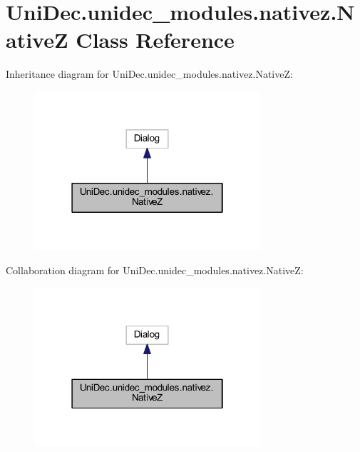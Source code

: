 \hypertarget{class_uni_dec_1_1unidec__modules_1_1nativez_1_1_native_z}{}\section{Uni\+Dec.\+unidec\+\_\+modules.\+nativez.\+Native\+Z Class Reference}
\label{class_uni_dec_1_1unidec__modules_1_1nativez_1_1_native_z}


Inheritance diagram for Uni\+Dec.\+unidec\+\_\+modules.\+nativez.\+Native\+Z\+:\nopagebreak
\begin{figure}[H]
\begin{center}
\leavevmode
\includegraphics[width=238pt]{class_uni_dec_1_1unidec__modules_1_1nativez_1_1_native_z__inherit__graph}
\end{center}
\end{figure}


Collaboration diagram for Uni\+Dec.\+unidec\+\_\+modules.\+nativez.\+Native\+Z\+:\nopagebreak
\begin{figure}[H]
\begin{center}
\leavevmode
\includegraphics[width=238pt]{class_uni_dec_1_1unidec__modules_1_1nativez_1_1_native_z__coll__graph}
\end{center}
\end{figure}
